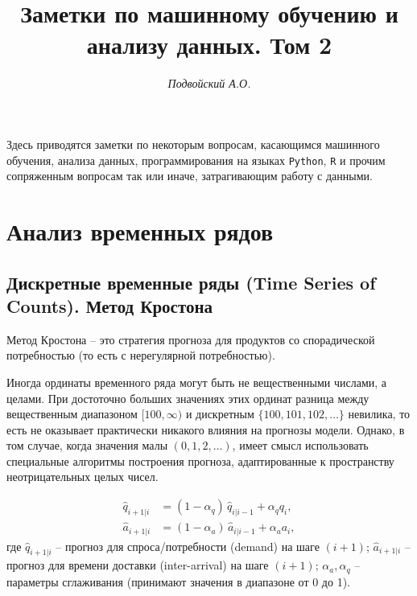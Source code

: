 \documentclass[%
	11pt,
	a4paper,
	utf8,
		]{article}
\begin{document}
\title{Заметки по машинному обучению и анализу данных. Том 2}

\author{\itshape Подвойский А.О.}

\date{}
\maketitle

\thispagestyle{fancy}

Здесь приводятся заметки по некоторым вопросам, касающимся машинного обучения, анализа данных, программирования на языках \texttt{Python}, \texttt{R} и прочим сопряженным вопросам так или иначе, затрагивающим работу с данными.



\tableofcontents

\section{Анализ временных рядов}

\subsection{Дискретные временные ряды (Time Series of Counts). Метод Кростона}

Метод Кростона -- это стратегия прогноза для продуктов со спорадической потребностью (то есть с нерегулярной потребностью).

Иногда ординаты временного ряда могут быть не вещественными числами, а целами. При достоточно больших значениях этих ординат разница между вещественным диапазоном $ [100, \infty) $ и дискретным $ \{100, 101, 102, \ldots \} $ невилика, то есть не оказывает практически никакого влияния на прогнозы модели. Однако, в том случае, когда значения малы $ (0, 1, 2, \ldots) $, имеет смысл использовать специальные алгоритмы построения прогноза, адаптированные к пространству неотрицательных целых чисел.

\begin{align*}
	\hat{q}_{i + 1 | i} &= (1 - \alpha_q) \, \hat{q}_{ i | i - 1 } + \alpha_q q_i, \\
	\hat{a}_{i + 1 | i} &= (1 - \alpha_a) \, \hat{a}_{ i | i - 1 } + \alpha_a a_i,
\end{align*}
где $ \hat{q}_{i + 1 | i} $ -- прогноз для спроса/потребности (demand) на шаге $ (i + 1) $; $ \hat{a}_{i + 1 | i} $ -- прогноз для времени доставки (inter-arrival) на шаге $ (i + 1) $; $ \alpha_a, \alpha_q $ -- параметры сглаживания (принимают значения в диапазоне от 0 до 1).
\end{document}
